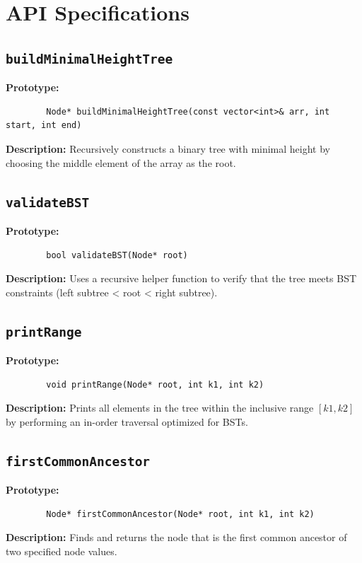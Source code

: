 \documentclass[11pt]{article}
\begin{document}
	\section{API Specifications}
	
	\subsection{\texttt{buildMinimalHeightTree}}
	\textbf{Prototype:}
	\begin{verbatim}
		Node* buildMinimalHeightTree(const vector<int>& arr, int start, int end)
	\end{verbatim}
	
	\textbf{Description:} Recursively constructs a binary tree with minimal height by choosing the middle element of the array as the root.
	
	\subsection{\texttt{validateBST}}
	\textbf{Prototype:}
	\begin{verbatim}
		bool validateBST(Node* root)
	\end{verbatim}
	
	\textbf{Description:} Uses a recursive helper function to verify that the tree meets BST constraints (left subtree < root < right subtree).
	
	\subsection{\texttt{printRange}}
	\textbf{Prototype:}
	\begin{verbatim}
		void printRange(Node* root, int k1, int k2)
	\end{verbatim}
	
	\textbf{Description:} Prints all elements in the tree within the inclusive range \([k1, k2]\) by performing an in-order traversal optimized for BSTs.
	
	\subsection{\texttt{firstCommonAncestor}}
	\textbf{Prototype:}
	\begin{verbatim}
		Node* firstCommonAncestor(Node* root, int k1, int k2)
	\end{verbatim}
	
	\textbf{Description:} Finds and returns the node that is the first common ancestor of two specified node values.
	
\end{document}
